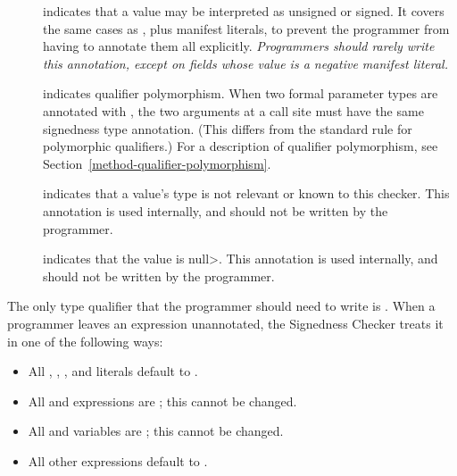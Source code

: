 \begin{description}
\item[]
    indicates that a value may be interpreted as unsigned or signed.  It
    covers the same cases as
    , plus manifest literals, to
    prevent the programmer from having to annotate them all explicitly.
    \emph{Programmers should rarely write this annotation,
    except on fields whose value is a negative manifest literal.}

 \item[]
   indicates qualifier polymorphism.
   When two formal parameter types are annotated with
   , the two arguments
   at a call site
   must have the same signedness type annotation.  (This differs from the
   standard rule for polymorphic qualifiers.)
   For a description of qualifier polymorphism, see
   Section~\ref{method-qualifier-polymorphism}.

\item[]
    indicates that a value's type is not relevant or known to this checker.
    This annotation is used internally, and should not be
    written by the programmer.

\item[]
  indicates that the value is \<null>.
    This annotation is used internally, and should not
    be written by the programmer.

\end{description}



The only type qualifier that the programmer should need to write is
.
When a programmer leaves an expression unannotated, the
Signedness Checker treats it in one of the following ways:

\begin{itemize}

    \item
    All , , , and  literals default
    to .
    \item
    All  and  expressions are
    ; this cannot be changed.
    \item
    All  and  variables are
    ; this cannot be changed.
    \item
    All other expressions default to .

\end{itemize}

